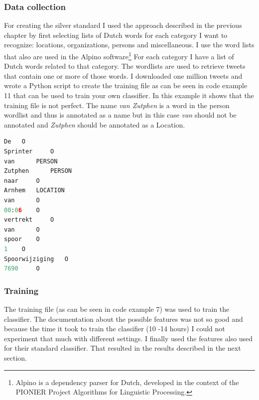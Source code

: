 \documentclass[
10pt, %
a4paper, %
oneside, %
headinclude,footinclude, %
BCOR5mm, %
]{scrartcl}
\begin{document}
\subsubsection{Data collection}
For creating the silver standard I used the approach described in the previous chapter by first selecting lists of Dutch words for each category I want to recognize: locations, organizations, persons and miscellaneous.   I use the word lists that also are used in the Alpino software\footnote{Alpino is a dependency parser for Dutch, developed in the context of the PIONIER Project Algorithms for Linguistic Processing. } For each category I have a list of Dutch words related to that category. The wordlists are used to retrieve tweets that contain one or more of those words. 
\vl
I downloaded one million tweets and wrote a Python script to create the training file as can be seen in code example 11 that can be used to train your own classifier. In this example it shows that the training file is not perfect. The name \textit{van Zutphen} is a word in the person wordlist and thus is annotated as a name but in this case \textit{van} should not be annotated and \textit{Zutphen} should be annotated as a Location.

\begin{lstlisting}[language=Python, caption=Training file NER]
De 	 O
Sprinter 	 O
van 	 PERSON
Zutphen 	 PERSON
naar 	 O
Arnhem 	 LOCATION
van 	 O
00:06 	 O
vertrekt 	 O
van 	 O
spoor 	 O
1 	 O
Spoorwijziging 	 O
7690 	 O
\end{lstlisting}



\subsubsection{Training}
The training file (as can be seen in code example 7) was used to train the classifier. The documentation about the possible features was not so good and because the time it took to train the classifier (10 -14 hours) I could not experiment that much with different settings. I finally used the features also used for their standard classifier. That resulted in the results described in the next section. 
\end{document}
